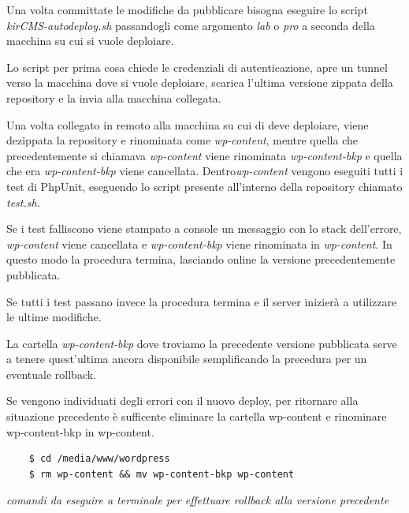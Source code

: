 Una volta committate le modifiche da pubblicare bisogna eseguire lo script \emph{kirCMS-autodeploy.sh} passandogli come argomento
\emph{lab} o \emph{pro} a seconda della macchina su cui si vuole deploiare.

Lo script per prima cosa chiede le credenziali di autenticazione, apre un tunnel verso la macchina dove si vuole deploiare, scarica l'ultima
versione zippata della repository e la invia alla macchina collegata.

Una volta collegato in remoto alla macchina su cui di deve deploiare, viene dezippata la repository e rinominata come \emph{wp-content}, mentre
quella che precedentemente si chiamava \emph{wp-content} viene rinominata \emph{wp-content-bkp} e quella che era \emph{wp-content-bkp}
viene cancellata.
Dentro\emph{wp-content} vengono eseguiti tutti i test di PhpUnit, eseguendo lo script presente all'interno della repository chiamato \emph{test.sh}.

Se i test falliscono viene stampato a console un messaggio con lo stack dell'errore, \emph{wp-content} viene cancellata e \emph{wp-content-bkp}
viene rinominata in \emph{wp-content}. In questo modo la procedura termina, lasciando online
la versione precedentemente pubblicata.

Se tutti i test passano invece la procedura termina e il server inizierà a
utilizzare le ultime modifiche.

La cartella \emph{wp-content-bkp} dove troviamo la precedente versione pubblicata serve a tenere quest'ultima ancora disponibile semplificando la precedura per un eventuale rollback. 

Se vengono individuati degli errori con il nuovo deploy, per ritornare alla situazione precedente è sufficente eliminare la cartella wp-content
e rinominare wp-content-bkp in wp-content.

\begin{verbatim}
	$ cd /media/www/wordpress 
	$ rm wp-content && mv wp-content-bkp wp-content
\end{verbatim}
\emph{comandi da eseguire a terminale per effettuare rollback alla versione precedente}

\newpage 

